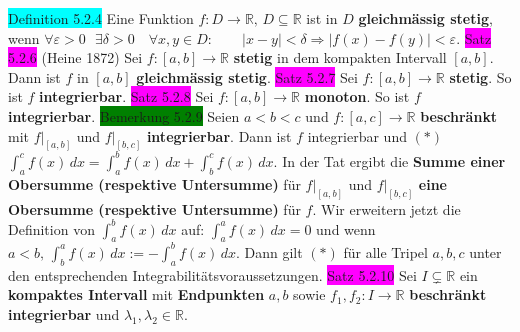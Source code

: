 \documentclass[landscape, 10pt]{article}
\newcommand{\R}{\mathbb{R}}
\begin{document}
\begin{multicols}{3}
\colorbox{cyan}{Definition 5.2.4} Eine Funktion 
                \textcolor{NavyBlue}{$f:D\longrightarrow\R,\,D\subseteq\R$}
                ist in \textcolor{NavyBlue}{$D$} \textbf{gleichmässig stetig}, wenn 
         \textcolor{NavyBlue}{
                $\forall\varepsilon>0\,\enspace\exists\delta>0\quad\forall x,y\in D:\qquad
                |x-y|<\delta\Longrightarrow|f(x)-f(y)|<\varepsilon$}.
\colorbox{magenta}{Satz 5.2.6} (Heine 1872) Sei 
                \textcolor{NavyBlue}{$f:[a,b]\longrightarrow\R$}
                \textbf{stetig} in dem kompakten Intervall \textcolor{NavyBlue}{$[a,b]$}. 
                Dann ist \textcolor{NavyBlue}{$f$} in \textcolor{NavyBlue}{$[a,b]$}
         \textbf{gleichmässig stetig}.
\colorbox{magenta}{Satz 5.2.7} Sei \textcolor{NavyBlue}{$f:[a,b]\longrightarrow\R$} 
                \textbf{stetig}. So ist \textcolor{NavyBlue}{$f$} \textbf{integrierbar}.
\colorbox{magenta}{Satz 5.2.8} Sei \textcolor{NavyBlue}{$f:[a,b]\longrightarrow\R$} 
                \textbf{monoton}. So ist \textcolor{NavyBlue}{$f$} \textbf{integrierbar}.
\colorbox{green}{Bemerkung 5.2.9} Seien \textcolor{NavyBlue}{$a<b<c$} und 
                \textcolor{NavyBlue}{$f:[a,c]\longrightarrow\R$} 
                \textbf{beschränkt} mit 
                \textcolor{NavyBlue}{$f|_{[a,b]}$} und \textcolor{NavyBlue}{$f|_{[b,c]}$} 
                \textbf{integrierbar}. Dann ist 
         \textcolor{NavyBlue}{$f$} integrierbar und 
                $(*)$ 
                \textcolor{NavyBlue}{$\int_a^cf(x)\,dx=\int_a^bf(x)\,dx+\int_b^cf(x)\,dx$}.
                In der Tat ergibt die \textbf{Summe einer Obersumme 
         (respektive Untersumme)} für 
                \textcolor{NavyBlue}{$f|_{[a,b]}$} und \textcolor{NavyBlue}{$f|_{[b,c]}$} 
                \textbf{eine Obersumme (respektive Untersumme)} für 
                \textcolor{NavyBlue}{$f$}. Wir
         erweitern jetzt die Definition von \textcolor{NavyBlue}{$\int_a^bf(x)\,dx$} auf: 
                \textcolor{NavyBlue}{$\int_a^af(x)\,dx=0$} und wenn 
                \textcolor{NavyBlue}{$a<b,\,\int_b^af(x)\,dx:=-\int_a^bf(x)\,dx$}.
         Dann gilt $(*)$ für alle Tripel \textcolor{NavyBlue}{$a,b,c$} unter den 
                entsprechenden Integrabilitätsvoraussetzungen. 
\colorbox{magenta}{Satz 5.2.10} Sei \textcolor{NavyBlue}{$I\subsetneq\R$} 
                ein \textbf{kompaktes Intervall} 
                mit \textbf{Endpunkten} \textcolor{NavyBlue}{$a,b$} sowie 
                \textcolor{NavyBlue}{$f_1,f_2:I\longrightarrow\R$}
                \textbf{beschränkt 
         integrierbar} und \textcolor{NavyBlue}{$\lambda_1,\lambda_2\in\R$}. 

\end{multicols}
\end{document}
